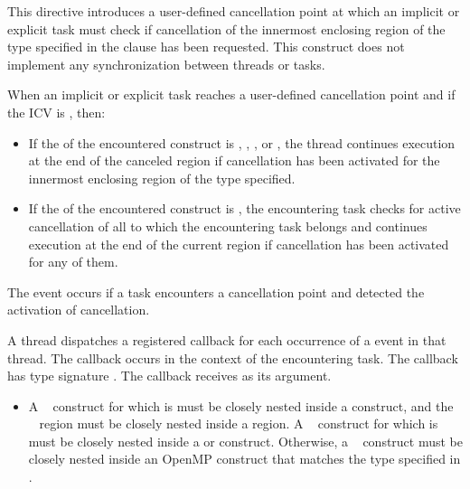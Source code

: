 \descr
This directive introduces a user-defined cancellation point at which an implicit or
explicit task must check if cancellation of the innermost enclosing region of the type
specified in the clause has been requested. This construct does not implement any
synchronization between threads or tasks.

When an implicit or explicit task reaches a user-defined cancellation point and if
the  ICV is , then:
\begin{itemize}
\item If the  of the encountered  construct is , , , or ,
the thread continues execution at the end of the canceled region if
cancellation has been activated for the innermost enclosing region of
the type specified.

\item If the  of the encountered
 construct is , the encountering
task checks for active cancellation of all   to which the
encountering task belongs and continues execution at the end of the current
 region if cancellation has been activated for any of them.
\end{itemize}


\events

The  event occurs if a task encounters a
cancellation point and detected the activation of cancellation.

\tools

A thread dispatches a registered 
callback for each occurrence of a  event in that thread.
The callback occurs in the context of the encountering task.  The callback has type signature
.
The callback receives  as its  argument.

\restrictions
\begin{itemize}
\item A ~ construct for which
 is  must be closely nested
inside a  construct, and the ~
region must be closely nested inside a  region. A
~ construct for which
 is  must be closely nested
inside a  or  construct. Otherwise, a
~ construct must be closely nested inside
an OpenMP construct that matches the type specified in
.
\end{itemize}

